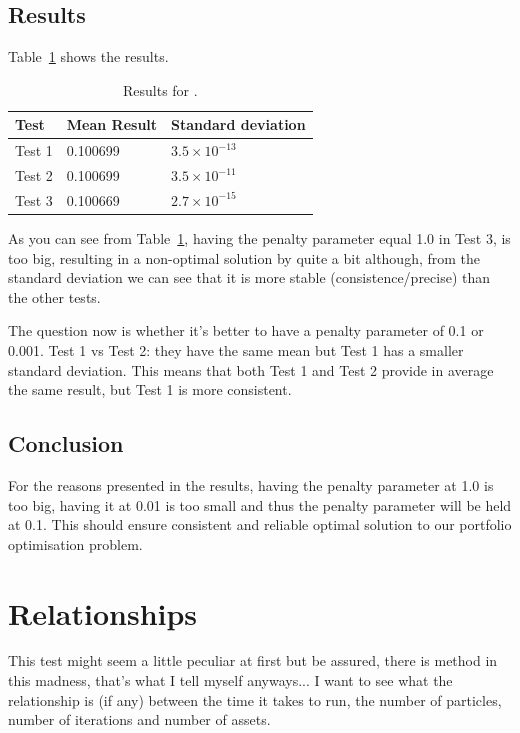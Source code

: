 \documentclass{pdfmx4020}
\begin{document}
    \subsection{Results}
      Table~\ref{table:penalty_results} shows the results. 
        \begin{table}[H]
          \setlength{\extrarowheight}{2.0pt}
          \begin{tabular}{|l|l|l|}
            \hline
            Test & Mean Result & Standard deviation \\
            \hline
            Test 1 & 0.100699 & $3.5\times10^{-13}$ \\
            \hline
            Test 2 & 0.100699 & $3.5\times10^{-11}$ \\
            \hline
            Test 3 & 0.100669 & $2.7\times10^{-15}$ \\
            \hline
          \end{tabular}
          \caption{Results for .}
          \label{table:penalty_results}
        \end{table}
      As you can see from Table~\ref{table:penalty_results}, having the penalty parameter equal 1.0 in Test 3, is too big, resulting in a non-optimal solution by quite a bit although, from the standard deviation we can see that it is more stable (consistence/precise) than the other tests. 

      The question now is whether it's better to have a penalty parameter of 0.1 or 0.001. Test 1 vs Test 2: they have the same mean but Test 1 has a smaller standard deviation. This means that both Test 1 and Test 2 provide in average the same result, but Test 1 is more consistent.

    \subsection{Conclusion}
      For the reasons presented in the results, having the penalty parameter at 1.0 is too big, having it at 0.01 is too small and thus the penalty parameter will be held at 0.1. This should ensure consistent and reliable optimal solution to our portfolio optimisation problem.

  \section{Relationships} %
  \label{sec:relationships}
  This test might seem a little peculiar at first but be assured, there is method in this madness, that's what I tell myself anyways... I want to see what the relationship is (if any) between the time it takes to run, the number of particles, number of iterations and number of assets.
\end{document}
